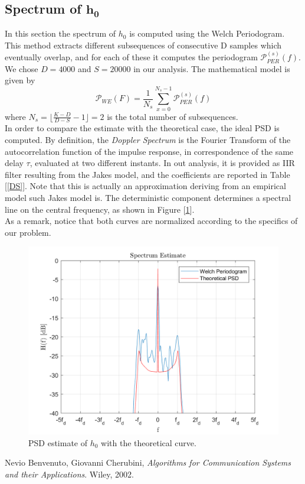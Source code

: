 \documentclass[a4paper, 12pt]{report}
\begin{document}
\clearpage
\subsection*{Spectrum of $\mathbf{h_0}$}
In this section the spectrum of $h_0$ is computed using the Welch Periodogram. This method extracts different subsequences of consecutive D samples which eventually overlap, and for each of these it computes the periodogram $\mathcal{P}_{PER}^{\left(s\right)}(f)$. We chose $D=4000$ and $S=20000$ in our analysis. The mathematical model is given by
\begin{equation*}
\mathcal{P}_{WE}(F) = \frac{1}{N_s}\sum_{x=0}^{N_s-1}\mathcal{P}_{PER}^{(s)}(f)
\end{equation*}
where $N_s = \lfloor \frac{K-D}{D-S}-1 \rfloor = 2$ is the total number of subsequences. \\
In order to compare the estimate with the theoretical case, the ideal PSD is computed. By definition, the \textit{Doppler Spectrum} is the Fourier Transform of the autocorrelation function of the impulse response, in correspondence of the same delay $\tau$, evaluated at two different instants. In out analysis, it is provided as IIR filter resulting from the Jakes model, and the coefficients are reported in Table [\ref{DS}]. Note that this is actually an approximation deriving from an empirical model such Jakes model is. The deterministic component determines a spectral line on the central frequency, as shown in Figure [\ref{Welch}].\\
As a remark, notice that both curves are normalized according to the specifics of our problem.

\begin{figure}[H]
	\centering
	\includegraphics[width=14cm]{images/Welch}
	\caption{PSD estimate of $h_0$ with the theoretical curve.}\label{Welch}
\end{figure}

\begin{thebibliography}{15}
	Nevio Benvenuto, Giovanni Cherubini,
	\textit{Algorithms for Communication Systems and their Applications}. 
	Wiley, 2002.
\end{thebibliography}
\end{document}
